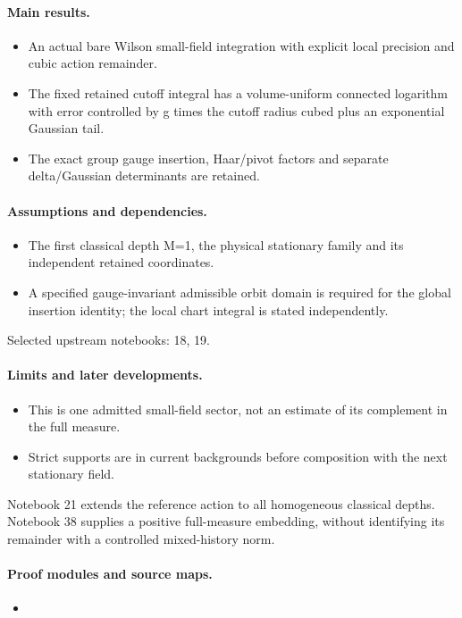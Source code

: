 \documentclass[11pt]{article}
\theoremstyle{remark}
\begin{document}
\paragraph{Main results.}
\begin{itemize}
\item An actual bare Wilson small-field integration with explicit local precision and cubic action remainder.
\item The fixed retained cutoff integral has a volume-uniform connected logarithm with error controlled by g times the cutoff radius cubed plus an exponential Gaussian tail.
\item The exact group gauge insertion, Haar/pivot factors and separate delta/Gaussian determinants are retained.
\end{itemize}

\paragraph{Assumptions and dependencies.}
\begin{itemize}
\item The first classical depth M=1, the physical stationary family and its independent retained coordinates.
\item A specified gauge-invariant admissible orbit domain is required for the global insertion identity; the local chart integral is stated independently.
\end{itemize}

Selected upstream notebooks: 18, 19.\par

\paragraph{Limits and later developments.}
\begin{itemize}
\item This is one admitted small-field sector, not an estimate of its complement in the full measure.
\item Strict supports are in current backgrounds before composition with the next stationary field.
\end{itemize}

Notebook 21 extends the reference action to all homogeneous classical depths. Notebook 38 supplies a positive full-measure embedding, without identifying its remainder with a controlled mixed-history norm.

\paragraph{Proof modules and source maps.}
\begingroup\small
\begin{itemize}
\item {}
\end{itemize}
\endgroup
\end{document}
